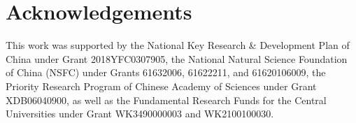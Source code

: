 \documentclass{article}
\begin{document}
	\section*{Acknowledgements}
	This work was supported by the National Key Research \& Development Plan of China under Grant 2018YFC0307905, the National Natural Science Foundation of China (NSFC) under Grants 61632006, 61622211, and 61620106009, the Priority Research Program of Chinese Academy of Sciences under Grant XDB06040900, as well as the Fundamental Research Funds for the Central Universities under Grant WK3490000003 and WK2100100030.
	
	
	
	
	
	
\end{document}
